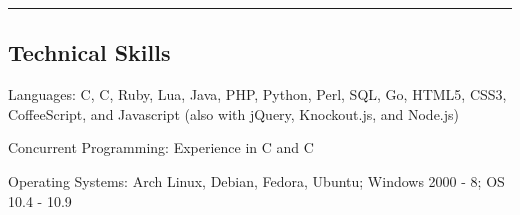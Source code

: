 \documentclass[12pt,letterpaper]{article}
\newenvironment{indentsection}[1]%
{\begin{list}{}%
        {\setlength{\leftmargin}{#1}}%
        \item[]%
}
{\end{list}}
\newcommand{\CPP}
{C\nolinebreak[4]\hspace{-.05em}\raisebox{.22ex}{\footnotesize\bf ++}}
\begin{document}
\hrule
\vspace{-0.4em}
\subsection*{Technical Skills}

\begin{indentsection}{\parindent}
\begin{description*}
        \item[Languages:]
                C, \CPP, Ruby, Lua, Java, PHP, Python, Perl, SQL, Go, HTML5, CSS3, CoffeeScript, and Javascript (also with jQuery, Knockout.js, and Node.js)
        \item[Concurrent Programming:]
        Experience in C and \CPP
        \item[Operating Systems:]
        Arch Linux, Debian, Fedora, Ubuntu; Windows 2000 - 8; OS 10.4 - 10.9
\end{description*}
\end{indentsection}
\end{document}
